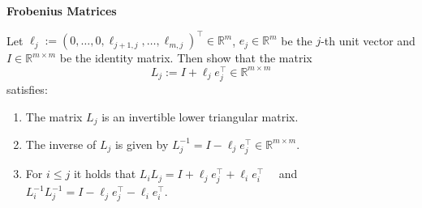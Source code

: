 \textbf{Frobenius Matrices}

Let $\ell_j := (0,\ldots,0,\ell_{j+1,j},\ldots,\ell_{m,j})^\top\in\mathbb{R}^m$, $e_j\in\mathbb{R}^m$ be the $j$-th unit vector and $I \in \mathbb{R}^{m\times m}$ be the identity matrix. Then show that the matrix $$L_j := I + \ell_je_j^\top \in \mathbb{R}^{m\times m}$$ satisfies:
\begin{enumerate}
	\item The matrix $L_j$ is an invertible lower triangular matrix.
	\item The inverse of $L_j$ is given by $L_j^{-1} = I - \ell_je_j^\top \in \mathbb{R}^{m\times m}$.
	\item For $i\leq j$ it holds that $L_iL_j = I + \ell_je_j^\top+ \ell_ie_i^\top$ ~~and~~ $L_i^{-1}L_j^{-1} = I - \ell_je_j^\top- \ell_ie_i^\top$.
\end{enumerate}